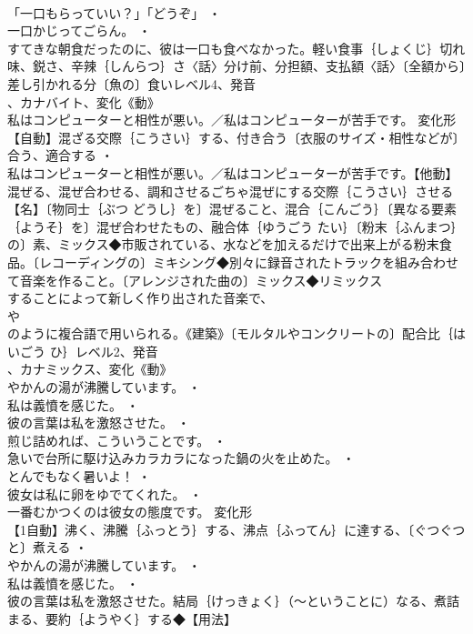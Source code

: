 \documentclass[8pt]{extreport}
\begin{document}
\begin{CJK}{UTF8}{min}
\\	「一口もらっていい？」「どうぞ」 ・
\\	一口かじってごらん。 ・
\\	すてきな朝食だったのに、彼は一口も食べなかった。軽い食事｛しょくじ｝切れ味、鋭さ、辛辣｛しんらつ｝さ〈話〉分け前、分担額、支払額〈話〉〔全額から〕差し引かれる分〔魚の〕食いレベル4、発音
\\	、カナバイト、変化《動》
\\	私はコンピューターと相性が悪い。／私はコンピューターが苦手です。	変化形 
\\	【自動】混ざる交際｛こうさい｝する、付き合う〔衣服のサイズ・相性などが〕合う、適合する ・
\\	私はコンピューターと相性が悪い。／私はコンピューターが苦手です。【他動】混ぜる、混ぜ合わせる、調和させるごちゃ混ぜにする交際｛こうさい｝させる【名】〔物同士｛ぶつ どうし｝を〕混ぜること、混合｛こんごう｝〔異なる要素｛ようそ｝を〕混ぜ合わせたもの、融合体｛ゆうごう たい｝〔粉末｛ふんまつ｝の〕素、ミックス◆市販されている、水などを加えるだけで出来上がる粉末食品。〔レコーディングの〕ミキシング◆別々に録音されたトラックを組み合わせて音楽を作ること。〔アレンジされた曲の〕ミックス◆リミックス
\\	することによって新しく作り出された音楽で、
\\	や
\\	のように複合語で用いられる。《建築》〔モルタルやコンクリートの〕配合比｛はいごう ひ｝レベル2、発音
\\	、カナミックス、変化《動》
\\	やかんの湯が沸騰しています。 ・
\\	私は義憤を感じた。 ・
\\	彼の言葉は私を激怒させた。 ・
\\	煎じ詰めれば、こういうことです。 ・
\\	急いで台所に駆け込みカラカラになった鍋の火を止めた。 ・
\\	とんでもなく暑いよ！ ・
\\	彼女は私に卵をゆでてくれた。 ・
\\	一番むかつくのは彼女の態度です。	変化形 
\\	【1自動】沸く、沸騰｛ふっとう｝する、沸点｛ふってん｝に達する、〔ぐつぐつと〕煮える ・
\\	やかんの湯が沸騰しています。 ・
\\	私は義憤を感じた。 ・
\\	彼の言葉は私を激怒させた。結局｛けっきょく｝（～ということに）なる、煮詰まる、要約｛ようやく｝する◆【用法】

\end{CJK}
\end{document}
